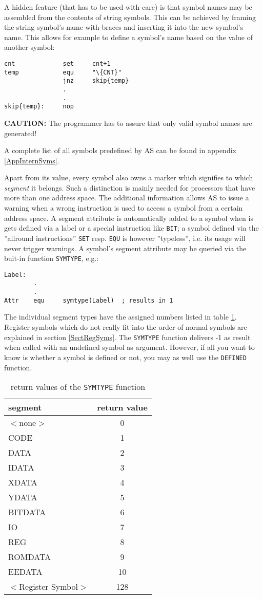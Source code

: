 \documentclass[12pt,twoside]{report}
\newcommand{\bb}[1]{{\bf #1}}
\newcommand{\tty}[1]{{\tt #1}}
\begin{document}
A hidden feature (that has to be used with care) is that symbol names
may be assembled from the contents of string symbols.  This can be
achieved by framing the string symbol's name with braces and
inserting it into the new symbol's name.  This allows for example to
define a symbol's name based on the value of another symbol:
\begin{verbatim}
cnt             set     cnt+1
temp            equ     "\{CNT}"
                jnz     skip{temp}
                .
                .
skip{temp}:     nop
\end{verbatim}
\bb{CAUTION:} The programmer has to assure that only valid symbol names
are generated!

A complete list of all symbols predefined by AS can be found in
appendix \ref{AppInternSyms}.

Apart from its value, every symbol also owns a marker which signifies to
which {\em segment} it belongs.  Such a distinction is mainly needed for
processors that have more than one address space.  The additional
information allows AS to issue a warning when a wrong instruction is used
to access a symbol from a certain address space.  A segment attribute is
automatically added to a symbol when is gets defined via a label or a
special instruction like \tty{BIT}; a symbol defined via the ''allround
instructions'' \tty{SET} resp. \tty{EQU} is however ''typeless'', i.e. its
usage will never trigger warnings.  A symbol's segment attribute may be
queried via the buit-in function \tty{SYMTYPE}, e.g.:
\begin{verbatim}
Label:
        .
        .
Attr    equ     symtype(Label)  ; results in 1
\end{verbatim}
The individual segment types have the assigned numbers listed in table
\ref{TabSegNums}.  Register symbols which do not really fit into the order
of normal symbols are explained in section \ref{SectRegSyms}.  The
\tty{SYMTYPE} function delivers -1 as result when called with an undefined
symbol as argument.  However, if all you want to know is whether a symbol
is defined or not, you may as well use the \tty{DEFINED} function.
\begin{table}[htb]
\begin{center}
\begin{tabular}{|l|c|}
\hline
segment & return value \\
\hline
$<$none$>$ & 0 \\
CODE & 1 \\
DATA & 2 \\
IDATA & 3 \\
XDATA & 4 \\
YDATA & 5 \\
BITDATA & 6 \\
IO & 7 \\
REG & 8 \\
ROMDATA & 9 \\
EEDATA & 10 \\
$<$Register Symbol$>$ & 128 \\
\hline
\end{tabular}
\end{center}
\caption{return values of the \tty{SYMTYPE} function\label{TabSegNums}}
\end{table}
\end{document}
